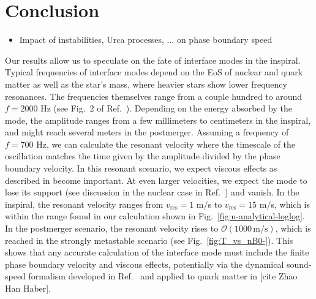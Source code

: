 \documentclass[10pt,superscriptaddress,
amsmath,aps,prc,twocolumn,nofootinbib,floatfix]{revtex4-1}
\newcommand{\com}[1]{{\sf\color[rgb]{0,0,1}[#1]}}
\newcommand{\AH}[1]{{\color{cyan}#1}}
\begin{document}
\section{Conclusion}
\label{sec:conclusion}
\begin{itemize}
    \item Impact of instabilities, Urca processes, ... on phase boundary speed
\end{itemize}
\AH{Our results allow us to speculate on the fate of interface modes in the inspiral. Typical frequencies of interface modes depend on the EoS of nuclear and quark matter as well as the star's mass, where heavier stars show lower frequency resonances. The frequencies themselves range from a couple hundred to around $f=2000$ Hz (see Fig.~2 of Ref.~\cite{Counsell:2025hcv}). Depending on the energy absorbed by the mode, the amplitude ranges from a few millimeters to centimeters in the inspiral, and might reach several meters in the postmerger. Assuming a frequency of $f=700$ Hz, we can calculate the resonant velocity where the timescale of the oscillation matches the time given by the amplitude divided by the phase boundary velocity. In this resonant scenario, we expect viscous effects as described in \cite{Alford:2014jha} become important. At even larger velocities, we expect the mode to lose its support (see discussion in the nuclear case in Ref.~\cite{Zhao:2025pgx}) and vanish. In the inspiral, the resonant velocity ranges from $v_\text{res}=1$ m$/$s to $v_\text{res}=15$ m$/$s, which is within the range found in our calculation shown in Fig.~\ref{fig:u-analytical-loglog}. In the postmerger scenario, the resonant velocity rises to $\mathcal{O}(1000\, \text{m/s})$, which is reached in the strongly metastable scenario (see Fig.~\ref{fig:T_vs_nB0-}). This shows that any accurate calculation of the interface mode must include the finite phase boundary velocity and viscous effects, potentially via the dynamical sound-speed formalism developed in Ref.~\cite{Zhao:2025pgx} and applied to quark matter in \com{cite Zhao Han Haber}.

}
\end{document}
